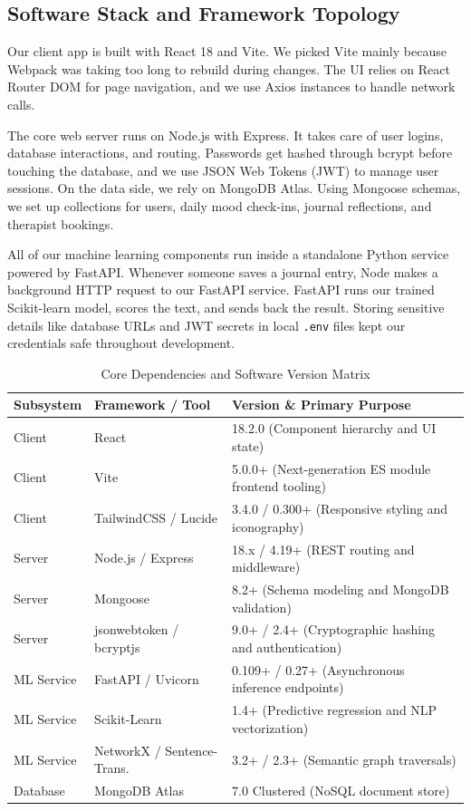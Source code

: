 \subsection{Software Stack and Framework Topology}
Our client app is built with React 18 and Vite. We picked Vite mainly because Webpack was taking too long to rebuild during changes. The UI relies on React Router DOM for page navigation, and we use Axios instances to handle network calls.

The core web server runs on Node.js with Express. It takes care of user logins, database interactions, and routing. Passwords get hashed through bcrypt before touching the database, and we use JSON Web Tokens (JWT) to manage user sessions. On the data side, we rely on MongoDB Atlas. Using Mongoose schemas, we set up collections for users, daily mood check-ins, journal reflections, and therapist bookings.

All of our machine learning components run inside a standalone Python service powered by FastAPI. Whenever someone saves a journal entry, Node makes a background HTTP request to our FastAPI service. FastAPI runs our trained Scikit-learn model, scores the text, and sends back the result. Storing sensitive details like database URLs and JWT secrets in local \texttt{.env} files kept our credentials safe throughout development.

\begin{table}[H]
\centering
\caption{Core Dependencies and Software Version Matrix}
\label{tab:software_matrix}
\begin{tabular}{llp{7.5cm}}
\toprule
\textbf{Subsystem} & \textbf{Framework / Tool} & \textbf{Version \& Primary Purpose} \\
\midrule
Client & React & 18.2.0 (Component hierarchy and UI state) \\
Client & Vite & 5.0.0+ (Next-generation ES module frontend tooling) \\
Client & TailwindCSS / Lucide & 3.4.0 / 0.300+ (Responsive styling and iconography) \\
Server & Node.js / Express & 18.x / 4.19+ (REST routing and middleware) \\
Server & Mongoose & 8.2+ (Schema modeling and MongoDB validation) \\
Server & jsonwebtoken / bcryptjs & 9.0+ / 2.4+ (Cryptographic hashing and authentication) \\
ML Service & FastAPI / Uvicorn & 0.109+ / 0.27+ (Asynchronous inference endpoints) \\
ML Service & Scikit-Learn & 1.4+ (Predictive regression and NLP vectorization) \\
ML Service & NetworkX / Sentence-Trans. & 3.2+ / 2.3+ (Semantic graph traversals) \\
Database & MongoDB Atlas & 7.0 Clustered (NoSQL document store) \\
\bottomrule
\end{tabular}
\end{table}


